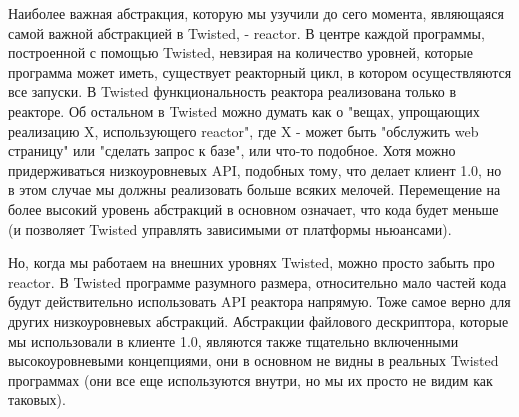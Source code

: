 Наиболее важная абстракция, которую мы узучили до сего 
момента, являющаяся самой важной абстракцией в Twisted, - 
reactor. В центре каждой программы, построенной с 
помощью Twisted, невзирая на количество уровней, которые 
программа может иметь, существует реакторный цикл, в 
котором осуществляются все запуски. В Twisted функциональность 
реактора реализована только в реакторе. Об остальном в Twisted 
можно думать как о "вещах, упрощающих реализацию X, использующего reactor", 
где X - может быть "обслужить web страницу" или "сделать запрос к базе", 
или что-то подобное. Хотя можно придерживаться низкоуровневых API, 
подобных тому, что делает клиент 1.0, но в этом случае мы должны реализовать 
больше всяких мелочей. Перемещение на более высокий уровень 
абстракций в основном означает, что кода будет меньше (и позволяет 
Twisted управлять зависимыми от платформы ньюансами).



Но, когда мы работаем на внешних уровнях Twisted, 
можно просто забыть про reactor. В Twisted 
программе разумного размера, относительно мало 
частей кода будут действительно использовать 
API реактора напрямую. Тоже самое верно для других 
низкоуровневых абстракций. Абстракции файлового 
дескриптора, которые мы использовали в клиенте 1.0, 
являются также тщательно включенными высокоуровневыми 
концепциями, они в основном не видны в реальных 
Twisted программах (они все еще используются внутри, 
но мы их просто не видим как таковых).



